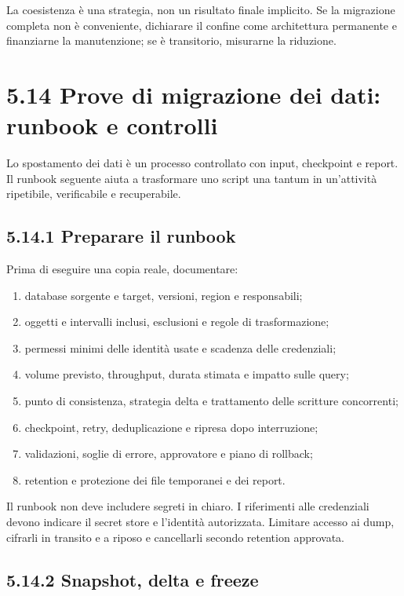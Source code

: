 \documentclass[
  italian,
  10pt,
]{book}
\providecommand{\tightlist}{%
  \setlength{\itemsep}{0pt}\setlength{\parskip}{0pt}}
\begin{document}
La coesistenza è una strategia, non un risultato finale implicito. Se la
migrazione completa non è conveniente, dichiarare il confine come
architettura permanente e finanziarne la manutenzione; se è transitorio,
misurarne la riduzione.

\section{5.14 Prove di migrazione dei dati: runbook e
controlli}\label{prove-di-migrazione-dei-dati-runbook-e-controlli}

Lo spostamento dei dati è un processo controllato con input, checkpoint
e report. Il runbook seguente aiuta a trasformare uno script una tantum
in un'attività ripetibile, verificabile e recuperabile.

\subsection{5.14.1 Preparare il runbook}\label{preparare-il-runbook}

Prima di eseguire una copia reale, documentare:

\begin{enumerate}
\def\labelenumi{\arabic{enumi}.}
\tightlist
\item
  database sorgente e target, versioni, region e responsabili;
\item
  oggetti e intervalli inclusi, esclusioni e regole di trasformazione;
\item
  permessi minimi delle identità usate e scadenza delle credenziali;
\item
  volume previsto, throughput, durata stimata e impatto sulle query;
\item
  punto di consistenza, strategia delta e trattamento delle scritture
  concorrenti;
\item
  checkpoint, retry, deduplicazione e ripresa dopo interruzione;
\item
  validazioni, soglie di errore, approvatore e piano di rollback;
\item
  retention e protezione dei file temporanei e dei report.
\end{enumerate}

Il runbook non deve includere segreti in chiaro. I riferimenti alle
credenziali devono indicare il secret store e l'identità autorizzata.
Limitare accesso ai dump, cifrarli in transito e a riposo e cancellarli
secondo retention approvata.

\subsection{5.14.2 Snapshot, delta e
freeze}\label{snapshot-delta-e-freeze}
\end{document}
